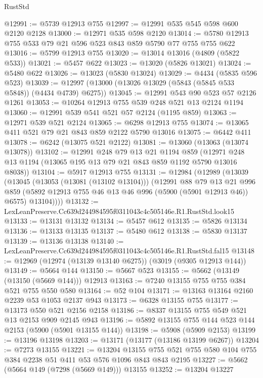 \begin{lexlean}{RustStd}
\begin{coremodule}
@12991 := @5739 @12913 @755
@12997 := @12991 @535 @545 @598 @600 @2120 @2128
@13000 := @12971 @535 @598 @2120
@13014 := @5780 @12913 @755 @533 @79 @21 @596 @523 @843 @859 @5790 @77 @755 @755 @622
@13016 := @5799 @12913 @755
@13020 := @13014 @13016 (@4809 (@5822 @533))
@13021 := @5457 @622
@13023 := @13020 (@5826 @13021)
@13024 := @5480 @622
@13026 := @13023 (@5830 @13024)
@13029 := @4434 (@5835 @596 @523)
@13039 := @12997 (@13000 (@13026 @13029 (@5843 (@5845 @533 @5848)) (@4434 @4739) @6275))
@13045 := @12991 @543 @90 @523 @57 @2126 @1261
@13053 := @10264 @12913 @755 @539 @248 @521 @13 @2124 @1194
@13060 := @12991 @539 @541 @521 @57 @2124 (@1195 @859)
@13063 := @12971 @539 @521 @2124
@13065 := @6298 @12913 @755
@13074 := @13065 @411 @521 @79 @21 @843 @859 @2122 @5790 @13016
@13075 := @6442 @411
@13078 := @6242 (@13075 @521 @2122)
@13081 := @13060 (@13063 (@13074 @13078))
@13102 := @12991
    @248
    @79
    @13
    @21
    @1194
    @859
    (@12971 @248 @13 @1194 (@13065 @195 @13 @79 @21 @843 @859 @1192 @5790 @13016 @8038))
@13104 := @5917 @12913 @755
@13131 := @12984
    (@12989
      (@13039
        (@13045
          (@13053 (@13081 (@13102 @13104)))
          (@12991
            @88
            @79
            @13
            @21
            @996
            @859
            (@5892 @12913 @755 @46 @13 @46 @996 (@5900 (@5901 @12913 @46)) @6575)
            @13104))))
@13132 := LexLeanPreserve.Cc639d244984595f0311043c4c505146e.R1.RustStd.look15
@13133 := @13131 @13132
@13134 := @5457 @612
@13135 := @5826 @13134
@13136 := @13133 @13135
@13137 := @5480 @612
@13138 := @5830 @13137
@13139 := @13136 @13138
@13140 := LexLeanPreserve.Cc639d244984595f0311043c4c505146e.R1.RustStd.fal15
@13148 := @12969 (@12974 (@13139 @13140 @6275)) (@3019 (@9305 @12913 @144))
@13149 := @5664 @144
@13150 := @5667 @523
@13155 := @5662 (@13149 (@13150 (@5669 @144))) @12913
@13163 := @7240 @13155 @755 @755 @384 @521 @755 @550 @580
@13164 := @52 @104
@13171 := @13163 @13164 @2160 @2239 @53 @1053 @2137 @943
@13173 := @6328 @13155 @755
@13177 := @13173 @550 @521 @2156 @2158
@13186 := @8337 @13155 @755 @549 @521 @13 @2153 @909 @2145 @943
@13196 := @5892 @13155 @755 @144 @523 @144 @2153 (@5900 (@5901 @13155 @144))
@13198 := @5908 (@5909 @2153)
@13199 := @13196 @13198
@13203 := @13171 (@13177 (@13186 @13199 @6267))
@13204 := @7273 @13155
@13221 := @13204
    @13155
    @755
    @521
    @755
    @580
    @104
    @755
    @384
    @2238
    @51
    @411
    @53
    @576
    @1096
    @843
    @843
    @2195
@13227 := @5662 (@5664 @149 (@7298 (@5669 @149))) @13155
@13252 := @13204
    @13227

\end{coremodule}
\end{lexlean}
